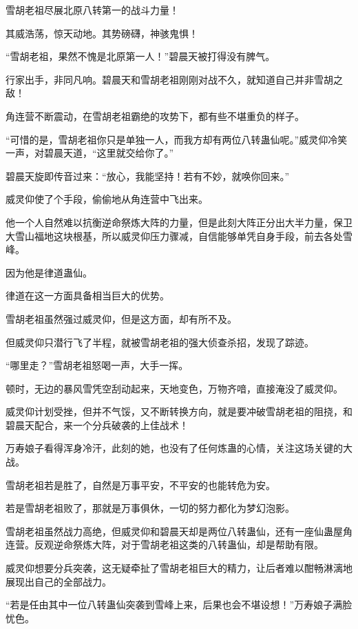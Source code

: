 
\begin{this_body}

雪胡老祖尽展北原八转第一的战斗力量！

其威浩荡，惊天动地。其势磅礴，神骇鬼惧！

“雪胡老祖，果然不愧是北原第一人！”碧晨天被打得没有脾气。

行家出手，非同凡响。碧晨天和雪胡老祖刚刚对战不久，就知道自己并非雪胡之敌！

角连营不断震动，在雪胡老祖霸绝的攻势下，都有些不堪重负的样子。

“可惜的是，雪胡老祖你只是单独一人，而我方却有两位八转蛊仙呢。”威灵仰冷笑一声，对碧晨天道，“这里就交给你了。”

碧晨天旋即传音过来：“放心，我能坚持！若有不妙，就唤你回来。”

威灵仰使了个手段，偷偷地从角连营中飞出来。

他一个人自然难以抗衡逆命祭炼大阵的力量，但是此刻大阵正分出大半力量，保卫大雪山福地这块根基，所以威灵仰压力骤减，自信能够单凭自身手段，前去各处雪峰。

因为他是律道蛊仙。

律道在这一方面具备相当巨大的优势。

雪胡老祖虽然强过威灵仰，但是这方面，却有所不及。

但威灵仰只潜行飞了半程，就被雪胡老祖的强大侦查杀招，发现了踪迹。

“哪里走？”雪胡老祖怒喝一声，大手一挥。

顿时，无边的暴风雪凭空刮动起来，天地变色，万物齐喑，直接淹没了威灵仰。

威灵仰计划受挫，但并不气馁，又不断转换方向，就是要冲破雪胡老祖的阻挠，和碧晨天配合，来一个分兵破袭的上佳战术！

万寿娘子看得浑身冷汗，此刻的她，也没有了任何炼蛊的心情，关注这场关键的大战。

雪胡老祖若是胜了，自然是万事平安，不平安的也能转危为安。

若是雪胡老祖败了，那就是万事俱休，一切的努力都化为梦幻泡影。

雪胡老祖虽然战力高绝，但威灵仰和碧晨天却是两位八转蛊仙，还有一座仙蛊屋角连营。反观逆命祭炼大阵，对于雪胡老祖这类的八转蛊仙，却是帮助有限。

威灵仰想要分兵突袭，这无疑牵扯了雪胡老祖巨大的精力，让后者难以酣畅淋漓地展现出自己的全部战力。

“若是任由其中一位八转蛊仙突袭到雪峰上来，后果也会不堪设想！”万寿娘子满脸忧色。


\end{this_body}

